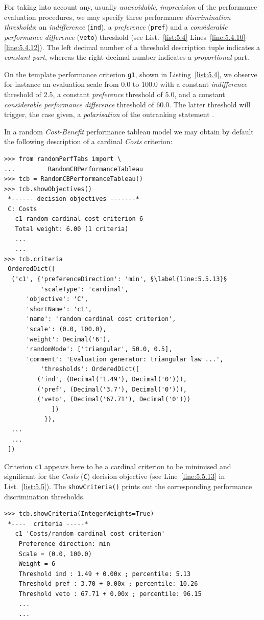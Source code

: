 For taking into account any, usually \emph{unavoidable}, \emph{imprecision} of the performance evaluation procedures, we may specify three performance \emph{discrimination thresholds}: an \emph{indifference} (\texttt{ind}), a \emph{preference} (\texttt{pref}) and a \emph{considerable performance difference} (\texttt{veto}) threshold (see List.~\vref{list:5.4} Lines~\ref{line:5.4.10}-\ref{line:5.4.12}). The left decimal number of a threshold description tuple indicates a \emph{constant part}, whereas the right decimal number indicates a \emph{proportional} part.

On the template performance criterion \texttt{g1}, shown in Listing~\vref{list:5.4}, we observe for instance an evaluation scale from $0.0$ to $100.0$ with a constant \emph{indifference} threshold of $2.5$, a constant \emph{preference} threshold of $5.0$, and a constant \emph{considerable performance difference} threshold of $60.0$. The latter threshold  will trigger, the case given, a \emph{polarisation} of the outranking statement \citep{BIS-2013}.

In a random \emph{Cost-Benefit} performance tableau model we may obtain by default the following description of a cardinal \emph{Costs} criterion:
\begin{lstlisting}[caption={Example of cardinal \emph{Costs} criterion},label=list:5.5]
>>> from randomPerfTabs import \
...         RandomCBPerformanceTableau
>>> tcb = RandomCBPerformanceTableau()
>>> tcb.showObjectives()
 *------ decision objectives -------*
 C: Costs
   c1 random cardinal cost criterion 6
   Total weight: 6.00 (1 criteria)
   ...
   ...
>>> tcb.criteria
 OrderedDict([
  ('c1', {'preferenceDirection': 'min', §\label{line:5.5.13}§
          'scaleType': 'cardinal',
	  'objective': 'C',
	  'shortName': 'c1',
	  'name': 'random cardinal cost criterion',
	  'scale': (0.0, 100.0),
	  'weight': Decimal('6'),
	  'randomMode': ['triangular', 50.0, 0.5],
	  'comment': 'Evaluation generator: triangular law ...',
          'thresholds': OrderedDict([
	     ('ind', (Decimal('1.49'), Decimal('0'))),
	     ('pref', (Decimal('3.7'), Decimal('0'))),
	     ('veto', (Decimal('67.71'), Decimal('0')))
             ])
           }),
  ...
  ...
 ])
\end{lstlisting}

Criterion \texttt{c1} appears here to be a cardinal criterion to be minimised and significant for the \emph{Costs} (\texttt{C}) decision objective (see Line~\ref{line:5.5.13} in List.~\vref{list:5.5}). The \texttt{showCriteria()} prints out the corresponding performance discrimination thresholds.
\begin{lstlisting}
>>> tcb.showCriteria(IntegerWeights=True)
 *----  criteria -----*
   c1 'Costs/random cardinal cost criterion'
    Preference direction: min
    Scale = (0.0, 100.0)
    Weight = 6 
    Threshold ind : 1.49 + 0.00x ; percentile: 5.13    
    Threshold pref : 3.70 + 0.00x ; percentile: 10.26 
    Threshold veto : 67.71 + 0.00x ; percentile: 96.15 
    ...
    ...
\end{lstlisting}

